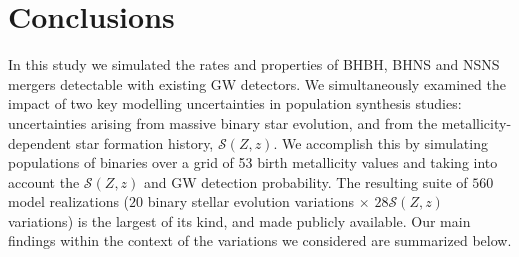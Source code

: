 \documentclass[fleqn,usenatbib]{mnras}
\newcommand{\SFRD}{\ensuremath{\mathcal{S}(Z,z)}\xspace}
\newcommand{\Nmodels}{\ensuremath{560}\xspace}
\newcommand{\NmodelsBPS}{\ensuremath{20}\xspace}
\newcommand{\NmodelsMSSFR}{\ensuremath{28}\xspace}
\begin{document}
\section{Conclusions}
\label{sec:conclusions}

In this study we simulated the rates and properties of \ac{BHBH}, \ac{BHNS} and \ac{NSNS} mergers detectable with existing GW detectors. We simultaneously examined the impact of two key modelling uncertainties in population synthesis studies: uncertainties arising from massive binary star evolution, and from the metallicity-dependent star formation history, \SFRD. We accomplish this by simulating populations of binaries over a grid of 53 birth metallicity values and taking into account the \SFRD and GW detection probability.  The resulting suite of \Nmodels model realizations (\NmodelsBPS binary stellar evolution variations $\times$ \NmodelsMSSFR \SFRD variations) is the largest of its kind, and made publicly available. Our main findings within the context of the variations we considered are summarized below.
\end{document}
